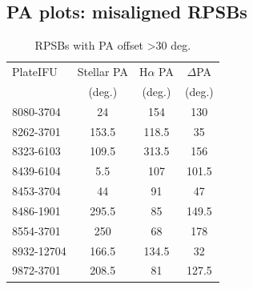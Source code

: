 \subsection{PA plots: misaligned RPSBs}

\begin{table}
\caption{RPSBs with PA offset \textgreater 30 deg.}
\label{tab:offsetRPSBs}
\begin{tabular}{lccc}
\hline
PlateIFU   & Stellar PA & H$\alpha$ PA & $\Delta$PA \\
  & (deg.) & (deg.) & (deg.) \\
\hline
8080-3704 & 24 & 154 & 130 \\
8262-3701 & 153.5 & 118.5 & 35 \\
8323-6103 & 109.5 & 313.5 & 156 \\
8439-6104 & 5.5 & 107 & 101.5 \\
8453-3704 & 44 & 91 & 47 \\
8486-1901 & 295.5 & 85 & 149.5 \\
8554-3701 & 250 & 68 & 178 \\
8932-12704 & 166.5 & 134.5 & 32 \\
9872-3701 & 208.5 & 81 & 127.5 \\
\hline
\end{tabular}
\end{table}

